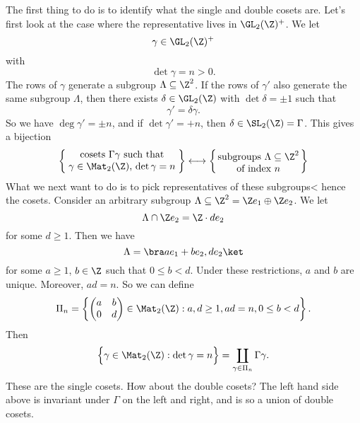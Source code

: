 \documentclass[a4paper]{article}
\begin{document}
The first thing to do is to identify what the single and double cosets are. Let's first look at the case where the representative lives in $\GL_2(\Z)^+$. We let
\[
  \gamma \in \GL_2(\Z)^+
\]
with
\[
  \det \gamma = n > 0.
\]
The rows of $\gamma$ generate a subgroup $\Lambda \subseteq \Z^2$. If the rows of $\gamma'$ also generate the same subgroup $\Lambda$, then there exists $\delta \in \GL_2(\Z)$ with $\det \delta = \pm 1$ such that
\[
  \gamma' = \delta \gamma.
\]
So we have $\deg \gamma' = \pm n$, and if $\det \gamma' = +n$, then $\delta \in \SL_2(\Z) = \Gamma$. This gives a bijection
\[
  \left\{\parbox{4cm}{\centering cosets $\Gamma \gamma$ such that\\$\gamma \in \Mat_2(\Z)$, $\det \gamma = n$}\right\} \longleftrightarrow \left\{\parbox{3cm}{\centering subgroups $\Lambda \subseteq \Z^2$ of index $n$} \right\}
\]
What we next want to do is to pick representatives of these subgroups< hence the cosets. Consider an arbitrary subgroup $\Lambda \subseteq \Z^2 = \Z e_1 \oplus \Z e_2$. We let
\[
  \Lambda \cap \Z e_2 = \Z \cdot d e_2
\]
for some $d \geq 1$. Then we have
\[
  \Lambda = \bra ae_1 + be_2, d e_2 \ket
\]
for some $a \geq 1$, $b \in \Z$ such that $0 \leq b < d$. Under these restrictions, $a$ and $b$ are unique. Moreover, $ad = n$. So we can define
\[
  \Pi_n = \left\{
    \begin{pmatrix}
      a & b\\
      0 & d
    \end{pmatrix} \in \Mat_2(\Z): a, d \geq 1, ad = n, 0 \leq b < d
  \right\}.
\]
Then
\[
  \Big\{\gamma \in \Mat_2(\Z): \det \gamma = n\Big\} = \coprod_{\gamma \in \Pi_n}\Gamma \gamma.
\]
These are the single cosets. How about the double cosets? The left hand side above is invariant under $\Gamma$ on the left and right, and is so a union of double cosets.
\end{document}
